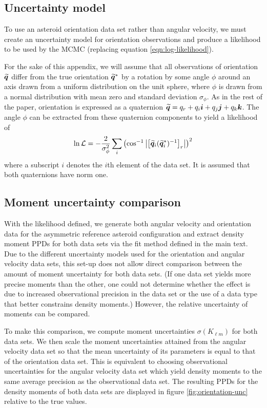 \subsection{Uncertainty model}
To use an asteroid orientation data set rather than angular velocity, we must create an uncertainty model for orientation observations and produce a likelihood to be used by the MCMC (replacing equation \ref{eqn:log-likelihood}).

For the sake of this appendix, we will assume that all observations of orientation $\widetilde{\bm{q}}$ differ from the true orientation $\widetilde{\bm{q}}^*$ by a rotation by some angle $\phi$ around an axis drawn from a uniform distribution on the unit sphere, where $\phi$ is drawn from a normal distribution with mean zero and standard deviation $\sigma_\phi$. As in the rest of the paper, orientation is expressed as a quaternion $\widetilde{\bm{q}} = q_r + q_i \bm i + q_j \bm j + q_k \bm k$. The angle $\phi$ can be extracted from these quaternion components to yield a likelihood of
\begin{equation}
  \ln \mathcal{L} = -\frac{2}{\sigma_\phi^2}\sum_{i}\left( \cos^{-1}\left|\left[ \widetilde{\bm{q}}_i (\widetilde{\bm{q}}_i^*)^{-1} \right]_r\right| \right)^2
  \label{eqn:orientation-like}
\end{equation}
where a subscript $i$ denotes the $i$th element of the data set. It is assumed that both quaternions have norm one.

\subsection{Moment uncertainty comparison}
With the likelihood defined, we generate both angular velocity and orientation data for the asymmetric reference asteroid configuration and extract density moment PPDs for both data sets via the fit method defined in the main text. Due to the different uncertainty models used for the orientation and angular velocity data sets, this set-up does not allow direct comparison between the amount of moment uncertainty for both data sets. (If one data set yields more precise moments than the other, one could not determine whether the effect is due to increased observational precision in the data set or the use of a data type that better constrains density moments.) However, the relative uncertainty of moments can be compared.

To make this comparison, we compute moment uncertainties $\sigma(K_{\ell m})$ for both data sets. We then scale the moment uncertainties attained from the angular velocity data set so that the mean uncertainty of its parameters is equal to that of the orientation data set. This is equivalent to choosing observational uncertainties for the angular velocity data set which yield density moments to the same average precision as the observational data set. The resulting PPDs for the density moments of both data sets are displayed in figure \ref{fig:orientation-unc} relative to the true values.

